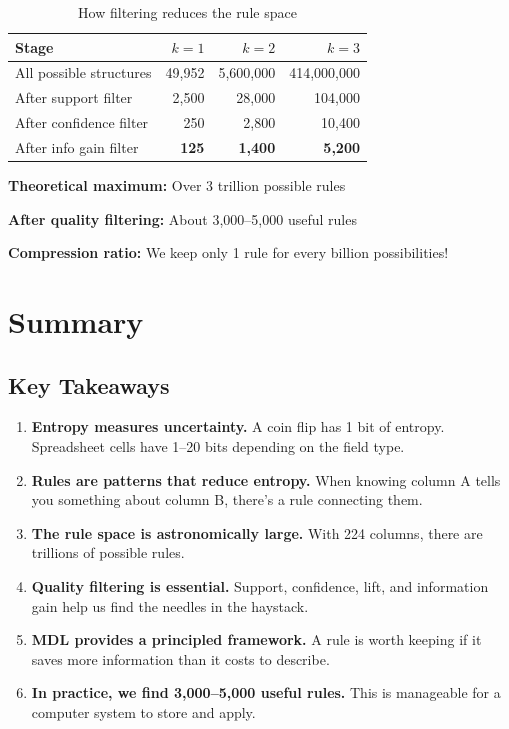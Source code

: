 \documentclass[11pt,a4paper]{article}
\begin{document}
\begin{table}[h]
\centering
\caption{How filtering reduces the rule space}
\begin{tabular}{@{}lrrr@{}}
\toprule
\textbf{Stage} & \textbf{$k=1$} & \textbf{$k=2$} & \textbf{$k=3$} \\
\midrule
All possible structures & 49,952 & 5,600,000 & 414,000,000 \\
After support filter & 2,500 & 28,000 & 104,000 \\
After confidence filter & 250 & 2,800 & 10,400 \\
After info gain filter & \textbf{125} & \textbf{1,400} & \textbf{5,200} \\
\bottomrule
\end{tabular}
\label{tab:filtering}
\end{table}

\begin{infobox}
\textbf{Theoretical maximum:} Over 3 trillion possible rules

\textbf{After quality filtering:} About 3,000--5,000 useful rules

\textbf{Compression ratio:} We keep only 1 rule for every billion possibilities!
\end{infobox}

\section{Summary}

\subsection{Key Takeaways}

\begin{enumerate}
    \item \textbf{Entropy measures uncertainty.} A coin flip has 1 bit of entropy. Spreadsheet cells have 1--20 bits depending on the field type.
    
    \item \textbf{Rules are patterns that reduce entropy.} When knowing column A tells you something about column B, there's a rule connecting them.
    
    \item \textbf{The rule space is astronomically large.} With 224 columns, there are trillions of possible rules.
    
    \item \textbf{Quality filtering is essential.} Support, confidence, lift, and information gain help us find the needles in the haystack.
    
    \item \textbf{MDL provides a principled framework.} A rule is worth keeping if it saves more information than it costs to describe.
    
    \item \textbf{In practice, we find 3,000--5,000 useful rules.} This is manageable for a computer system to store and apply.
\end{enumerate}
\end{document}
